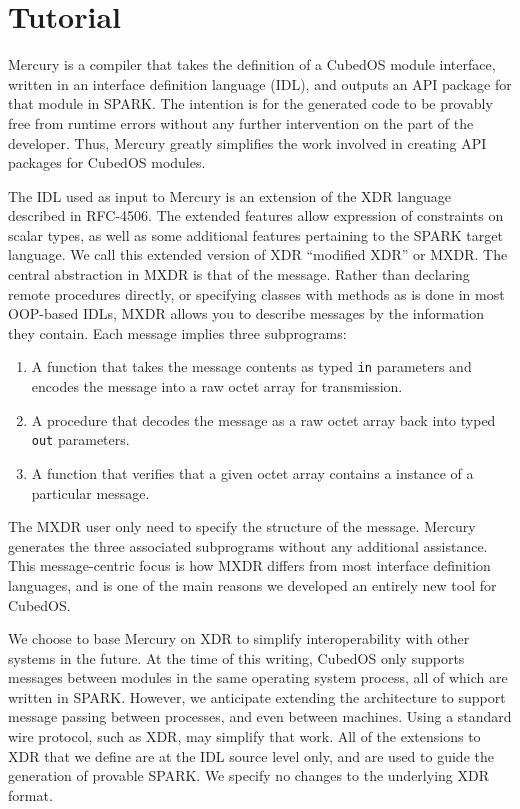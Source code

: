 \section{Tutorial}
\label{sec:mercury-tutorial}

Mercury is a compiler that takes the definition of a CubedOS module interface, written in an
interface definition language (IDL), and outputs an API package for that module in SPARK. The
intention is for the generated code to be provably free from runtime errors without any further
intervention on the part of the developer. Thus, Mercury greatly simplifies the work involved in
creating API packages for CubedOS modules.

The IDL used as input to Mercury is an extension of the XDR language described in RFC-4506. The
extended features allow expression of constraints on scalar types, as well as some additional
features pertaining to the SPARK target language. We call this extended version of XDR
``modified XDR'' or MXDR. The central abstraction in MXDR is that of the message. Rather than
declaring remote procedures directly, or specifying classes with methods as is done in most
OOP-based IDLs, MXDR allows you to describe messages by the information they contain. Each
message implies three subprograms:

\begin{enumerate}
\item A function that takes the message contents as typed \texttt{in} parameters and encodes the
message into a raw octet array for transmission.
\item A procedure that decodes the message as a raw octet array back into typed \texttt{out}
parameters.
\item A function that verifies that a given octet array contains a instance of a particular
message.
\end{enumerate}

The MXDR user only need to specify the structure of the message. Mercury generates the three
associated subprograms without any additional assistance. This message-centric focus is how MXDR
differs from most interface definition languages, and is one of the main reasons we developed an
entirely new tool for CubedOS.

We choose to base Mercury on XDR to simplify interoperability with other systems in the future.
At the time of this writing, CubedOS only supports messages between modules in the same
operating system process, all of which are written in SPARK. However, we anticipate extending
the architecture to support message passing between processes, and even between machines. Using
a standard wire protocol, such as XDR, may simplify that work. All of the extensions to XDR that
we define are at the IDL source level only, and are used to guide the generation of provable
SPARK. We specify no changes to the underlying XDR format.

